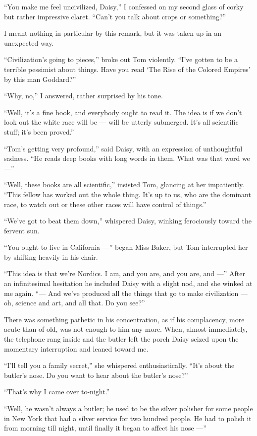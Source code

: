 \documentclass{znotebook}
\begin{document}
``You make me feel uncivilized, Daisy,'' I confessed on my second glass of corky but rather impressive claret. ``Can't you talk about crops or something?''

I meant nothing in particular by this remark, but it was taken up in an unexpected way.

``Civilization's going to pieces,'' broke out Tom violently. ``I've gotten to be a terrible pessimist about things. Have you read ‘The Rise of the Colored Empires' by this man Goddard?''

``Why, no,'' I answered, rather surprised by his tone.

``Well, it's a fine book, and everybody ought to read it. The idea is if we don't look out the white race will be ---{} will be utterly submerged. It's all scientific stuff; it's been proved.''

``Tom's getting very profound,'' said Daisy, with an expression of unthoughtful sadness. ``He reads deep books with long words in them. What was that word we ---''

``Well, these books are all scientific,'' insisted Tom, glancing at her impatiently. ``This fellow has worked out the whole thing. It's up to us, who are the dominant race, to watch out or these other races will have control of things.''

``We've got to beat them down,'' whispered Daisy, winking ferociously toward the fervent sun.

``You ought to live in California ---{}'' began Miss Baker, but Tom interrupted her by shifting heavily in his chair.

``This idea is that we're Nordics. I am, and you are, and you are, and ---'' After an infinitesimal hesitation he included Daisy with a slight nod, and she winked at me again. ``---{} And we've produced all the things that go to make civilization ---{} oh, science and art, and all that. Do you see?''

There was something pathetic in his concentration, as if his complacency, more acute than of old, was not enough to him any more. When, almost immediately, the telephone rang inside and the butler left the porch Daisy seized upon the momentary interruption and leaned toward me.

``I'll tell you a family secret,'' she whispered enthusiastically. ``It's about the butler's nose. Do you want to hear about the butler's nose?''

``That's why I came over to-night.''

``Well, he wasn't always a butler; he used to be the silver polisher for some people in New York that had a silver service for two hundred people. He had to polish it from morning till night, until finally it began to affect his nose ---''
\end{document}
